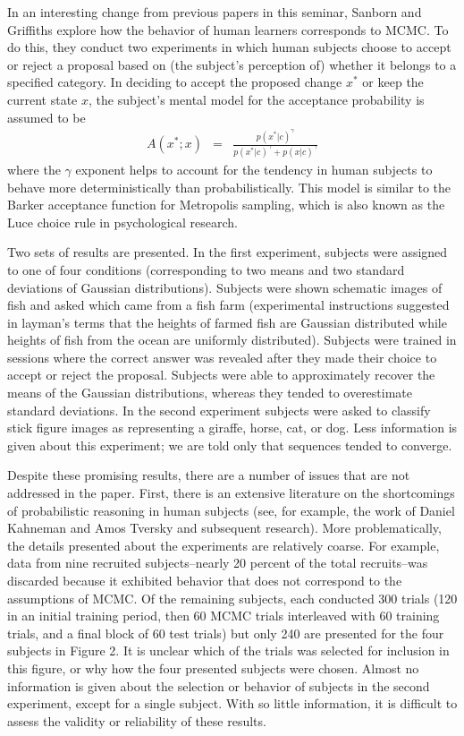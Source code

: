 \documentclass[12pt,letterpaper]{article}
\begin{document}
In an interesting change from previous papers in this seminar, Sanborn and Griffiths explore how the behavior of human learners corresponds to MCMC. To do this, they conduct two experiments in which human subjects choose to accept or reject a proposal based on (the subject's perception of) whether it belongs to a specified category. In deciding to accept the proposed change $x^*$ or keep the current state $x$, the subject's mental model for the acceptance probability is assumed to be
\begin{eqnarray*}
A(x^*; x) &=& \frac{ p(x^*|c)^{\gamma} }{ p(x^*|c)^{\gamma} + p(x|c)^{\gamma} }
\end{eqnarray*}
where the $\gamma$ exponent helps to account for the tendency in human subjects to behave more deterministically than probabilistically. This model is similar to the Barker acceptance function for Metropolis sampling, which is also known as the Luce choice rule in psychological research. 

Two sets of results are presented. In the first experiment, subjects were assigned to one of four conditions (corresponding to two means and two standard deviations of Gaussian distributions). Subjects were shown schematic images of fish and asked which came from a fish farm (experimental instructions suggested in layman's terms that the heights of farmed fish are Gaussian distributed while heights of fish from the ocean are uniformly distributed). Subjects were trained in sessions where the correct answer was revealed after they made their choice to accept or reject the proposal. Subjects were able to approximately recover the means of the Gaussian distributions, whereas they tended to overestimate standard deviations. In the second experiment subjects were asked to classify stick figure images as representing a giraffe, horse, cat, or dog. Less information is given about this experiment; we are told only that sequences tended to converge.

Despite these promising results, there are a number of issues that are not addressed in the paper. First, there is an extensive literature on the shortcomings of probabilistic reasoning in human subjects (see, for example, the work of Daniel Kahneman and Amos Tversky and subsequent research). More problematically, the details presented about the experiments are relatively coarse. For example, data from nine recruited subjects--nearly 20 percent of the total recruits--was discarded because it exhibited behavior that does not correspond to the assumptions of MCMC. Of the remaining subjects, each conducted 300 trials (120 in an initial training period, then 60 MCMC trials interleaved with 60 training trials, and a final block of 60 test trials) but only 240 are presented for the four subjects in Figure 2. It is unclear which of the trials was selected for inclusion in this figure, or why how the four presented subjects were chosen. Almost no information is given about the selection or behavior of subjects in the second experiment, except for a single subject. With so little information, it is difficult to assess the validity or reliability of these results. 
\end{document}
